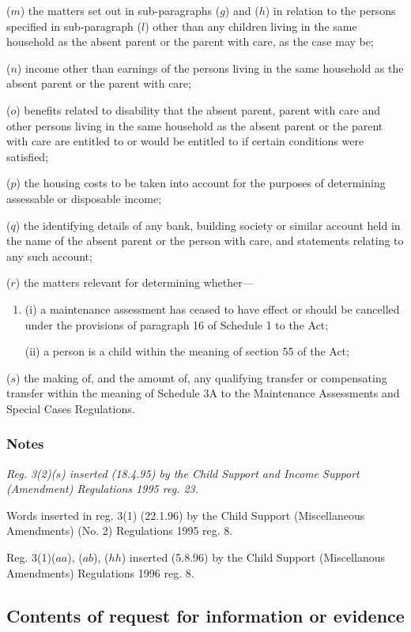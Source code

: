 \documentclass[a4paper]{article}
\newcommand\amendment[1]{\subsubsection*{Notes}{\itshape\frenchspacing\footnotesize #1 \par}}
\begin{document}
\begin{enumerate}
($m$) the matters set out in sub-paragraphs ($g$) and ($h$) in relation to the persons specified in sub-paragraph ($l$) other than any children living in the same household as the absent parent or the parent with care, as the case may be;

($n$) income other than earnings of the persons living in the same household as the absent parent or the parent with care;

($o$) benefits related to disability that the absent parent, parent with care and other persons living in the same household as the absent parent or the parent with care are entitled to or would be entitled to if certain conditions were satisfied;

($p$) the housing costs to be taken into account for the purposes of determining assessable or disposable income;

($q$) the identifying details of any bank, building society or similar account held in the name of the absent parent or the person with care, and statements relating to any such account;

($r$) the matters relevant for determining whether—
\begin{enumerate}\item[]
(i) a maintenance assessment has ceased to have effect or should be cancelled under the provisions of paragraph 16 of Schedule 1 to the Act;

(ii) a person is a child within the meaning of section 55 of the Act;
\end{enumerate}

($s$) the making of, and the amount of, any qualifying transfer or compensating transfer within the meaning of Schedule 3A to the Maintenance Assessments and Special Cases Regulations.
\end{enumerate}

\amendment{
Reg. 3(2)($s$) inserted (18.4.95) by the Child Support and Income Support (Amendment) Regulations 1995 reg. 23.

Words inserted in reg. 3(1) (22.1.96) by the Child Support (Miscellaneous Amendments) (No. 2) Regulations 1995 reg. 8.

Reg. 3(1)($aa$), ($ab$), ($hh$) inserted (5.8.96) by the Child Support (Miscellanous Amendments) Regulations 1996 reg. 8.
}

\subsection[3A. Contents of request for information or evidence]{Contents of request for information or evidence}
\end{document}
